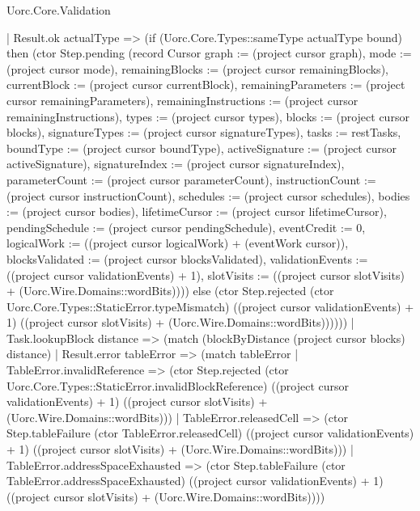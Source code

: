 \begin{lexlean}{Uorc.Core.Validation}
\begin{semanticmodule}
{          | Result.ok actualType => (if (Uorc.Core.Types::sameType actualType bound) then (ctor Step.pending (record Cursor {graph := (project cursor graph), mode := (project cursor mode), remainingBlocks := (project cursor remainingBlocks), currentBlock := (project cursor currentBlock), remainingParameters := (project cursor remainingParameters), remainingInstructions := (project cursor remainingInstructions), types := (project cursor types), blocks := (project cursor blocks), signatureTypes := (project cursor signatureTypes), tasks := restTasks, boundType := (project cursor boundType), activeSignature := (project cursor activeSignature), signatureIndex := (project cursor signatureIndex), parameterCount := (project cursor parameterCount), instructionCount := (project cursor instructionCount), schedules := (project cursor schedules), bodies := (project cursor bodies), lifetimeCursor := (project cursor lifetimeCursor), pendingSchedule := (project cursor pendingSchedule), eventCredit := 0, logicalWork := ((project cursor logicalWork) + (eventWork cursor)), blocksValidated := (project cursor blocksValidated), validationEvents := ((project cursor validationEvents) + 1), slotVisits := ((project cursor slotVisits) + (Uorc.Wire.Domains::wordBits))})) else (ctor Step.rejected (ctor Uorc.Core.Types::StaticError.typeMismatch) ((project cursor validationEvents) + 1) ((project cursor slotVisits) + (Uorc.Wire.Domains::wordBits))))))
      | Task.lookupBlock distance => (match (blockByDistance (project cursor blocks) distance)
        | Result.error tableError => (match tableError
          | TableError.invalidReference => (ctor Step.rejected (ctor Uorc.Core.Types::StaticError.invalidBlockReference) ((project cursor validationEvents) + 1) ((project cursor slotVisits) + (Uorc.Wire.Domains::wordBits)))
          | TableError.releasedCell => (ctor Step.tableFailure (ctor TableError.releasedCell) ((project cursor validationEvents) + 1) ((project cursor slotVisits) + (Uorc.Wire.Domains::wordBits)))
          | TableError.addressSpaceExhausted => (ctor Step.tableFailure (ctor TableError.addressSpaceExhausted) ((project cursor validationEvents) + 1) ((project cursor slotVisits) + (Uorc.Wire.Domains::wordBits))))
}
\end{semanticmodule}
\end{lexlean}
